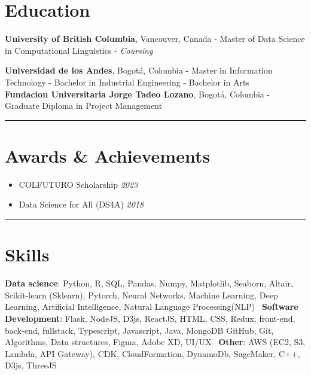 \documentclass[10pt,a4paper]{article}
\begin{document}
\section*{Education}

\textbf{University of British Columbia}, Vancouver, Canada - Master of Data Science in Computational Linguistics - \textit{Coursing}

\textbf{Universidad de los Andes}, Bogotá, Colombia - Master in Information Technology - Bachelor in Industrial Engineering - Bachelor in Arts \\
\textbf{Fundacion Universitaria Jorge Tadeo Lozano}, Bogotá, Colombia - Graduate Diploma in Project Management\\
\rule{\textwidth}{0.4pt} 

\section*{Awards \& Achievements}

\begin{itemize}[noitemsep]
    \item COLFUTURO Scholarship \hfill \textit{2023}
    \item Data Science for All (DS4A)  \hfill \textit{2018}
\end{itemize}

\rule{\textwidth}{0.4pt} 

\section*{Skills}
\textbf{Data science}: Python, R, SQL, Pandas, Numpy, Matplotlib, Seaborn, Altair, Scikit-learn (Sklearn), Pytorch, Neural Networks, Machine Learning, Deep Learning, Artificial Intelligence, Natural Language Processing(NLP)
\textbar\ \textbf{Software Development}: Flask, NodeJS, D3js, ReactJS, HTML, CSS, Redux, front-end, back-end, fullstack, Typescript, Javascript, Java, MongoDB
GitHub, Git, Algorithms, Data structures, Figma, Adobe XD, UI/UX
\textbar\ \textbf{Other}:  AWS (EC2, S3, Lambda, API Gateway), CDK, CloudFormation, DynamoDb, SageMaker, C++, D3js, ThreeJS
\end{document}
